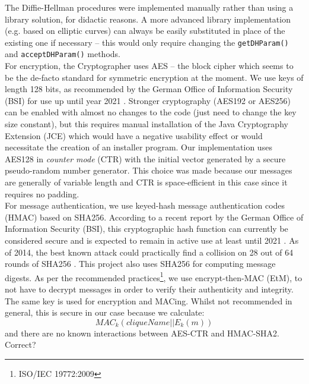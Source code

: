 \documentclass[a4paper, 12pt]{report}
\begin{document}
The Diffie-Hellman procedures were implemented manually rather than using a library solution, for didactic reasons. A more advanced library implementation (e.g. based on elliptic curves) can always be easily substituted in place of the existing one if necessary -- this would only require changing the \texttt{getDHParam()} and \texttt{acceptDHParam()} methods. \\ 

For encryption, the Cryptographer uses AES -- the block cipher which seems to be the de-facto standard for symmetric encryption at the moment. We use keys of length 128 bits, as recommended by the German Office of Information Security (BSI) for use up until year 2021 \cite{margraf2016kryptographische}. Stronger cryptography (AES192 or AES256) can be enabled with almost no changes to the code (just need to change the key size constant), but this requires manual installation of the Java Cryptography Extension (JCE) which would have a negative usability effect or would necessitate the creation of an installer program. Our implementation uses AES128 in \emph{counter mode} (CTR) with the initial vector generated by a secure pseudo-random number generator. This choice was made because our messages are generally of variable length and CTR is space-efficient in this case since it requires no padding. \\

For message authentication, we use keyed-hash message authentication codes (HMAC) based on SHA256. According to a recent report by the German Office of Information Security (BSI), this cryptographic hash function can currently be considered secure and is expected to remain in active use at least until 2021 \cite{margraf2016kryptographische}. As of 2014, the best known attack could practically find a collision on 28 out of 64 rounds of SHA256 \cite{dobraunig2014analysis}. This project also uses SHA256 for computing message digests. As per the recommended practices\footnote{ISO/IEC 19772:2009}, we use encrypt-then-MAC (EtM), to not have to decrypt messages in order to verify their authenticity and integrity. \\

The same key is used for encryption and MACing. Whilst not recommended in general, this is secure in our case because we calculate:
\begin{equation*}
    MAC_k(cliqueName||E_k(m))
\end{equation*}
and there are no known interactions between AES-CTR and HMAC-SHA2. {\color{red}Correct?}
\end{document}
